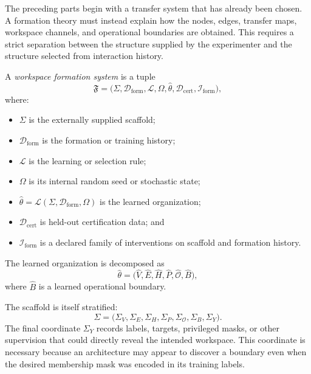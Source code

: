 

The preceding parts begin with a transfer system that has already been chosen.
A formation theory must instead explain how the nodes, edges, transfer maps,
workspace channels, and operational boundaries are obtained. This requires a
strict separation between the structure supplied by the experimenter and the
structure selected from interaction history.

\begin{definition}\label{def:formation-system}
A \emph{workspace formation system} is a tuple
\[
\mathfrak F
=
\bigl(
\Sigma,
\mathcal D_{\mathrm{form}},
\mathcal L,
\Omega,
\widehat\theta,
\mathcal D_{\mathrm{cert}},
\mathcal I_{\mathrm{form}}
\bigr),
\]
where:
\begin{itemize}
\item \(\Sigma\) is the externally supplied scaffold;
\item \(\mathcal D_{\mathrm{form}}\) is the formation or training history;
\item \(\mathcal L\) is the learning or selection rule;
\item \(\Omega\) is its internal random seed or stochastic state;
\item \(\widehat\theta=\mathcal L(\Sigma,\mathcal D_{\mathrm{form}},\Omega)\)
 is the learned organization;
\item \(\mathcal D_{\mathrm{cert}}\) is held-out certification data; and
\item \(\mathcal I_{\mathrm{form}}\) is a declared family of interventions on
 scaffold and formation history.
\end{itemize}
The learned organization is decomposed as
\[
\widehat\theta
=
\bigl(
\widehat V,
\widehat E,
\widehat H,
\widehat P,
\widehat{\mathcal O},
\widehat B
\bigr),
\]
where \(\widehat B\) is a learned operational boundary.
\end{definition}

The scaffold is itself stratified:
\[
\boxed{
\Sigma
=
\bigl(
\Sigma_V,
\Sigma_E,
\Sigma_H,
\Sigma_P,
\Sigma_{\mathcal O},
\Sigma_B,
\Sigma_Y
\bigr).
}
\]
The final coordinate \(\Sigma_Y\) records labels, targets, privileged masks,
or other supervision that could directly reveal the intended workspace. This
coordinate is necessary because an architecture may appear to discover a
boundary even when the desired membership mask was encoded in its training
labels.

